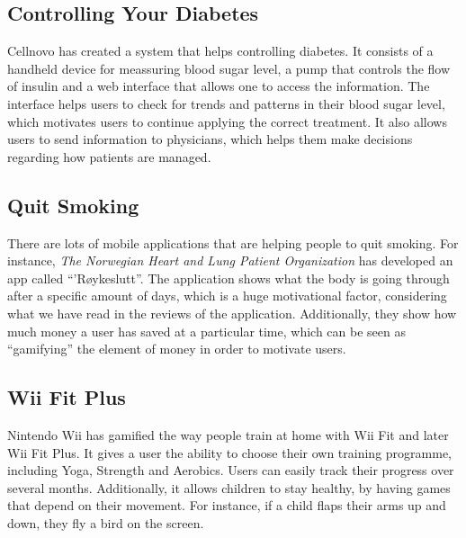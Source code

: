 \subsection{Controlling Your Diabetes}
Cellnovo has created a system that helps controlling diabetes. It consists of a handheld device for meassuring blood sugar level, a pump that controls the flow of insulin and a web interface that allows one to access the information. The interface helps users to check for trends and patterns in their blood sugar level, which motivates users to continue applying the correct treatment. It also allows users to send information to physicians, which helps them make decisions regarding how patients are managed.
      


\subsection{Quit Smoking}
There are lots of mobile applications that are helping people to quit smoking. For instance, \emph{The Norwegian Heart and Lung Patient Organization} has developed an app called ``'R\o ykeslutt''. The application shows what the body is going through after a specific amount of days, which is a huge motivational factor, considering what we have read in the reviews of the application. Additionally, they show how much money a user has saved at a particular time, which can be seen as ``gamifying'' the element of money in order to motivate users.  


\subsection{Wii Fit Plus}
Nintendo Wii has gamified the way people train at home with Wii Fit and later Wii Fit Plus. It gives a user the ability to choose their own training programme, including Yoga, Strength and Aerobics. Users can easily track their progress over several months. Additionally, it allows children to stay healthy, by having games that depend on their movement. For instance, if a child flaps their arms up and down, they fly a bird on the screen.    
 